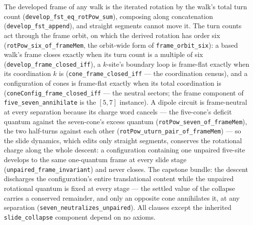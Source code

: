 \begin{theorem}\label{thm:disclination-charge-conservation}\leanok{}
The developed frame of any walk is the iterated rotation by the walk's
total turn count (\texttt{develop\_fst\_eq\_rotPow\_sum}), composing along
concatenation (\texttt{develop\_fst\_append}), and straight segments cannot
move it. The turn counts act through the frame orbit, on which the derived
rotation has order six (\texttt{rotPow\_six\_of\_frameMem}, the orbit-wide
form of \texttt{frame\_orbit\_six}): a based walk's frame closes exactly
when its turn count is a multiple of six
(\texttt{develop\_frame\_closed\_iff}), a $k$-site's boundary loop is
frame-flat exactly when its coordination $k$ is
(\texttt{cone\_frame\_closed\_iff} --- the coordination census), and a
configuration of cones is frame-flat exactly when its total coordination
is (\texttt{coneConfig\_frame\_closed\_iff} --- the neutral sectors; the
frame component of \texttt{five\_seven\_annihilate} is the $[5,7]$
instance). A dipole circuit is frame-neutral at every separation because
its charge word cancels --- the five-cone's deficit quantum against the
seven-cone's excess quantum (\texttt{rotPow\_seven\_of\_frameMem}), the two
half-turns against each other (\texttt{rotPow\_uturn\_pair\_of\_frameMem})
--- so the slide dynamics, which edits only straight segments, conserves
the rotational charge along the whole descent: a configuration containing
one unpaired five-site develops to the same one-quantum frame at every
slide stage (\texttt{unpaired\_frame\_invariant}) and never closes. The
capstone bundle: the descent discharges the configuration's entire
translational content while the unpaired rotational quantum is fixed at
every stage --- the settled value of the collapse carries a conserved
remainder, and only an opposite cone annihilates it, at any separation
(\texttt{seven\_neutralizes\_unpaired}). All clauses except the inherited
\texttt{slide\_collapse} component depend on no axioms.
\end{theorem}

